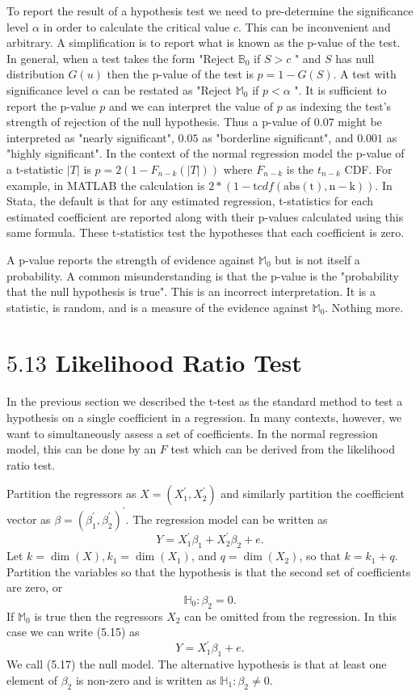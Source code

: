 \documentclass[10pt]{article}
\begin{document}
To report the result of a hypothesis test we need to pre-determine the significance level $\alpha$ in order to calculate the critical value $c$. This can be inconvenient and arbitrary. A simplification is to report what is known as the p-value of the test. In general, when a test takes the form "Reject $\mathbb{B}_{0}$ if $S>c$ " and $S$ has null distribution $G(u)$ then the p-value of the test is $p=1-G(S)$. A test with significance level $\alpha$ can be restated as "Reject $\mathbb{M}_{0}$ if $p<\alpha$ ". It is sufficient to report the p-value $p$ and we can interpret the value of $p$ as indexing the test's strength of rejection of the null hypothesis. Thus a $\mathrm{p}$-value of $0.07$ might be interpreted as "nearly significant", $0.05$ as "borderline significant", and $0.001$ as "highly significant". In the context of the normal regression model the p-value of a t-statistic $|T|$ is $p=2\left(1-F_{n-k}(|T|)\right)$ where $F_{n-k}$ is the $t_{n-k}$ CDF. For example, in MATLAB the calculation is $2 *(1-\mathrm{t} c d f(\mathrm{abs}(\mathrm{t}), \mathrm{n}-\mathrm{k}))$. In Stata, the default is that for any estimated regression, t-statistics for each estimated coefficient are reported along with their p-values calculated using this same formula. These t-statistics test the hypotheses that each coefficient is zero.

A p-value reports the strength of evidence against $\mathbb{M}_{0}$ but is not itself a probability. A common misunderstanding is that the p-value is the "probability that the null hypothesis is true". This is an incorrect interpretation. It is a statistic, is random, and is a measure of the evidence against $\mathbb{M}_{0}$. Nothing more.

\section{$5.13$ Likelihood Ratio Test}
In the previous section we described the t-test as the standard method to test a hypothesis on a single coefficient in a regression. In many contexts, however, we want to simultaneously assess a set of coefficients. In the normal regression model, this can be done by an $F$ test which can be derived from the likelihood ratio test.

Partition the regressors as $X=\left(X_{1}^{\prime}, X_{2}^{\prime}\right)$ and similarly partition the coefficient vector as $\beta=\left(\beta_{1}^{\prime}, \beta_{2}^{\prime}\right)^{\prime}$. The regression model can be written as
$$
Y=X_{1}^{\prime} \beta_{1}+X_{2}^{\prime} \beta_{2}+e .
$$
Let $k=\operatorname{dim}(X), k_{1}=\operatorname{dim}\left(X_{1}\right)$, and $q=\operatorname{dim}\left(X_{2}\right)$, so that $k=k_{1}+q$. Partition the variables so that the hypothesis is that the second set of coefficients are zero, or
$$
\mathbb{H}_{0}: \beta_{2}=0 .
$$
If $\mathbb{M}_{0}$ is true then the regressors $X_{2}$ can be omitted from the regression. In this case we can write (5.15) as
$$
Y=X_{1}^{\prime} \beta_{1}+e .
$$
We call (5.17) the null model. The alternative hypothesis is that at least one element of $\beta_{2}$ is non-zero and is written as $\mathbb{H}_{1}: \beta_{2} \neq 0$.
\end{document}
